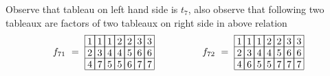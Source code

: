 {Observe that tableau on left hand side is \(t_7\), also observe that following two tableaux are factors of two tableaux on right side in above relation
\begin{align*}
{\def\lr#1{\multicolumn{1}{|@{\hspace{.6ex}}c@{\hspace{.6ex}}|}{\raisebox{-.3ex}{$#1$}}}
\raisebox{-.6ex}{$f_{71}\ =\ \begin{array}[c]{*{7}c}\cline{1-7}
\lr{1}&\lr{1}&\lr{1}&\lr{2}&\lr{2}&\lr{3}&\lr{3}\\\cline{1-7}
\lr{2}&\lr{3}&\lr{4}&\lr{4}&\lr{5}&\lr{6}&\lr{6}\\\cline{1-7}
\lr{4}&\lr{7}&\lr{5}&\lr{5}&\lr{6}&\lr{7}&\lr{7}\\\cline{1-7}
\end{array}$}
}\hspace{50pt}
{\def\lr#1{\multicolumn{1}{|@{\hspace{.6ex}}c@{\hspace{.6ex}}|}{\raisebox{-.3ex}{$#1$}}}
\raisebox{-.6ex}{$f_{72}\ =\ \begin{array}[c]{*{7}c}\cline{1-7}
\lr{1}&\lr{1}&\lr{1}&\lr{2}&\lr{2}&\lr{3}&\lr{3}\\\cline{1-7}
\lr{2}&\lr{3}&\lr{4}&\lr{4}&\lr{5}&\lr{6}&\lr{6}\\\cline{1-7}
\lr{4}&\lr{6}&\lr{5}&\lr{5}&\lr{7}&\lr{7}&\lr{7}\\\cline{1-7}
\end{array}$}
}
\end{align*}

}
